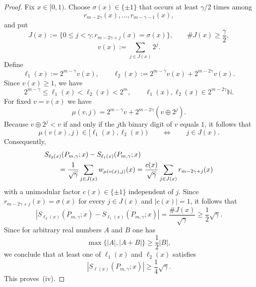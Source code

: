 \documentclass[10pt,a4paper]{amsart}
\begin{document}
\begin{proof}
Fix $x\in[0,1)$. Choose $\sigma(x)\in\{\pm1\}$ that occurs at least $\gamma
/2$ times among 
\begin{equation*}
r_{m-2\gamma}(x),\dots,r_{m-\gamma-1}(x),
\end{equation*}
and put 
\begin{equation*}
J(x):=\{0\le j<\gamma: r_{m-2\gamma+j}(x)=\sigma(x)\}, \qquad \#J(x)\ge 
\frac{\gamma}{2},
\end{equation*}
\begin{equation*}
v(x):=\sum_{j\in J(x)} 2^j.
\end{equation*}
Define 
\begin{equation*}
\ell_1(x):=2^{m-\gamma}v(x), \qquad
\ell_2(x):=2^{m-\gamma}v(x)+2^{m-2\gamma}v(x).
\end{equation*}
Since $v(x)\ge1$, we have 
\begin{equation*}
2^{m-\gamma}\le \ell_1(x)<\ell_2(x)<2^m, \qquad \ell_1(x),\ell_2(x)\in
2^{m-2\gamma}\mathbb{N}.
\end{equation*}
For fixed $v=v(x)$ we have 
\begin{equation*}
\mu(v,j)=2^{m-\gamma}v+2^{m-2\gamma}(v\oplus 2^j).
\end{equation*}
Because $v\oplus 2^j<v$ if and only if the $j$th binary digit of $v$ equals $%
1$, it follows that 
\begin{equation*}
\mu(v(x),j)\in [\ell_1(x),\ell_2(x)) \qquad \Longleftrightarrow \qquad j\in
J(x).
\end{equation*}
Consequently, 
\begin{align*}
&S_{\ell_2(x)}(P_{m,\gamma};x)-S_{\ell_1(x)}(P_{m,\gamma};x) \\
&\qquad = \frac{1}{\sqrt{\gamma}}\sum_{j\in J(x)} w_{\mu(v(x),j)}(x) =\frac{%
c(x)}{\sqrt{\gamma}}\sum_{j\in J(x)} r_{m-2\gamma+j}(x)
\end{align*}
with a unimodular factor $c(x)\in\{\pm1\}$ independent of $j$. Since $%
r_{m-2\gamma+j}(x)=\sigma(x)$ for every $j\in J(x)$ and $|c(x)|=1$, it
follows that 
\begin{equation*}
\left|S_{\ell_2(x)}(P_{m,\gamma};x)-S_{\ell_1(x)}(P_{m,\gamma};x)\right|= 
\frac{\#J(x)}{\sqrt{\gamma}}\ge \frac12\sqrt{\gamma}.
\end{equation*}
Since for arbitrary real numbers $A$ and $B$ one has 
\begin{equation*}
\max\{|A|,|A+B|\}\ge \frac12|B|,
\end{equation*}
we conclude that at least one of $\ell_1(x)$ and $\ell_2(x)$ satisfies 
\begin{equation*}
|S_{\ell(x)}(P_{m,\gamma};x)|\ge \frac14\sqrt{\gamma}.
\end{equation*}
This proves~(iv).
\end{proof}
\end{document}
